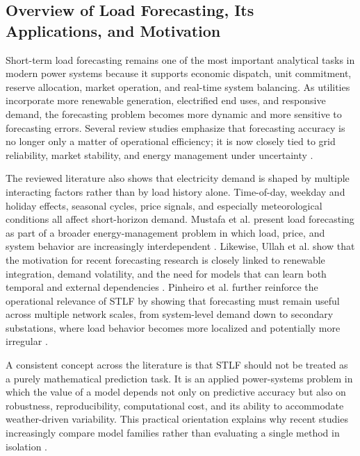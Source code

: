 \documentclass[conference]{IEEEtran}
\begin{document}
\subsection{Overview of Load Forecasting, Its Applications, and Motivation}
Short-term load forecasting remains one of the most important analytical tasks in modern power systems because it supports economic dispatch, unit commitment, reserve allocation, market operation, and real-time system balancing. As utilities incorporate more renewable generation, electrified end uses, and responsive demand, the forecasting problem becomes more dynamic and more sensitive to forecasting errors. Several review studies emphasize that forecasting accuracy is no longer only a matter of operational efficiency; it is now closely tied to grid reliability, market stability, and energy management under uncertainty \cite{10630814,10320357,hammad2020,habbak2023}. 

The reviewed literature also shows that electricity demand is shaped by multiple interacting factors rather than by load history alone. Time-of-day, weekday and holiday effects, seasonal cycles, price signals, and especially meteorological conditions all affect short-horizon demand. Mustafa et al. present load forecasting as part of a broader energy-management problem in which load, price, and system behavior are increasingly interdependent \cite{10320357}. Likewise, Ullah et al. show that the motivation for recent forecasting research is closely linked to renewable integration, demand volatility, and the need for models that can learn both temporal and external dependencies \cite{10630814}. Pinheiro et al. further reinforce the operational relevance of STLF by showing that forecasting must remain useful across multiple network scales, from system-level demand down to secondary substations, where load behavior becomes more localized and potentially more irregular \cite{Pinheiro}. 

A consistent concept across the literature is that STLF should not be treated as a purely mathematical prediction task. It is an applied power-systems problem in which the value of a model depends not only on predictive accuracy but also on robustness, reproducibility, computational cost, and its ability to accommodate weather-driven variability. This practical orientation explains why recent studies increasingly compare model families rather than evaluating a single method in isolation \cite{10630814,10320357,hammad2020}.
\end{document}
